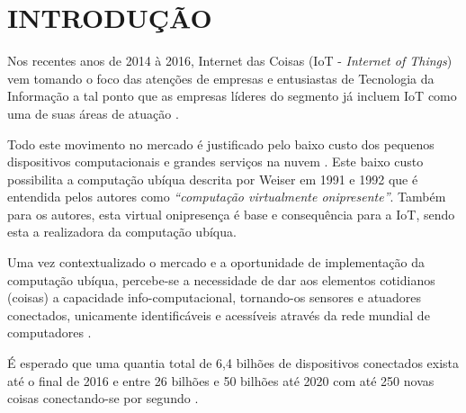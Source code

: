 \chapter[INTRODUÇÃO]{INTRODUÇÃO}

Nos recentes anos de 2014 à 2016, Internet das Coisas (IoT - \textit{Internet of
Things}) vem tomando o foco das atenções de empresas e entusiastas de Tecnologia
da Informação \cite{DzoneIoT:2015} a tal ponto que as empresas líderes do
segmento já incluem IoT como uma de suas áreas de atuação \cite{Ibm2016,
ARM-mbed, Microsoft2016, Intel2016, Oracle2016, Google2016, AmazonIoT2016}.

Todo este movimento no mercado é justificado pelo baixo custo dos pequenos
dispositivos computacionais \cite{RpiZeroLaunch, Esp8266.net} e grandes
serviços na nuvem \cite{Kaufmann2015, Amazon2016}. Este baixo custo
possibilita a computação ubíqua descrita por Weiser em 1991 e 1992
\cite{Weiser1999} que é entendida pelos autores como \textit{``computação
virtualmente onipresente''}. Também para os autores, esta virtual onipresença é
base e consequência para a IoT, sendo esta a realizadora da computação ubíqua.

Uma vez contextualizado o mercado e a oportunidade de implementação da
computação ubíqua, percebe-se a necessidade de dar aos elementos cotidianos
(coisas) a capacidade info-computacional, tornando-os sensores e atuadores
conectados, unicamente identificáveis e acessíveis através da rede mundial de
computadores \cite{Lemos2013, Kranenburg2012}.

É esperado que uma quantia total de 6,4 bilhões de dispositivos conectados
exista até o final de 2016 \cite{GARTNER2015} e entre 26 bilhões
\cite{GARTNER2014} e 50 bilhões até 2020 com até 250 novas coisas conectando-se
por segundo \cite{CiscoBlog2013}.
